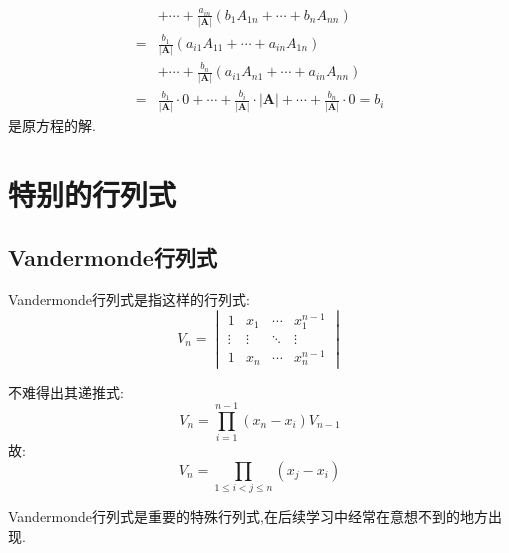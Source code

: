 \begin{formal}
\begin{Proof}
\begin{align*}
  &+\cdots+\frac{a_{in}}{\left|\bm{A}\right|}
  \left(
    b_1A_{1n}+\cdots+
    b_nA_{nn}
  \right)\\
  =&\frac{b_1}{\left|\bm{A}\right|}
  \left(a_{i1}A_{11}+
  \cdots+
  a_{in}A_{1n}\right)\\
  &+\cdots+\frac{b_n}{\left|\bm{A}\right|}
  \left(
    a_{i1}A_{n1}+\cdots+
    a_{in}A_{nn}
  \right)\\
  =&\frac{b_1}{\left|\bm{A}\right|}
  \cdot 0+\cdots+
  \frac{b_i}{\left|\bm{A}\right|}
  \cdot \left|\bm{A}\right|+\cdots+
  \frac{b_n}{\left|\bm{A}\right|}
  \cdot 0 = b_i
\end{align*}
是原方程的解.
\end{Proof}
\end{formal}
\newpage
\section{特别的行列式}
\subsection{Vandermonde行列式}
\begin{brown}
\begin{example}
\textup{Vandermonde}行列式是指这样的行列式:
\[
V_n = \begin{vmatrix}
    1 & x_1 & \cdots & x_1^{n - 1} \\
    \vdots & \vdots & \ddots & \vdots \\
    1 & x_n & \cdots & x_n^{n - 1} 
\end{vmatrix}
\]
\end{example}
\begin{solution}
不难得出其递推式:
\[
V_n = \prod _{ i  = 1 }^{n - 1}\left(x_n  - x_i\right) V_{n - 1}
\]
故:
\[
V_n  = \prod _{1 \leqslant i < j \leqslant n}
\left(x _j - x_i\right)
\]
\end{solution}
\end{brown}
\begin{red}
\begin{remark}
    \textup{Vandermonde}行列式是重要的特殊行列式,在后续学习中经常在意想不到的地方出现.
\end{remark}
\end{red}

